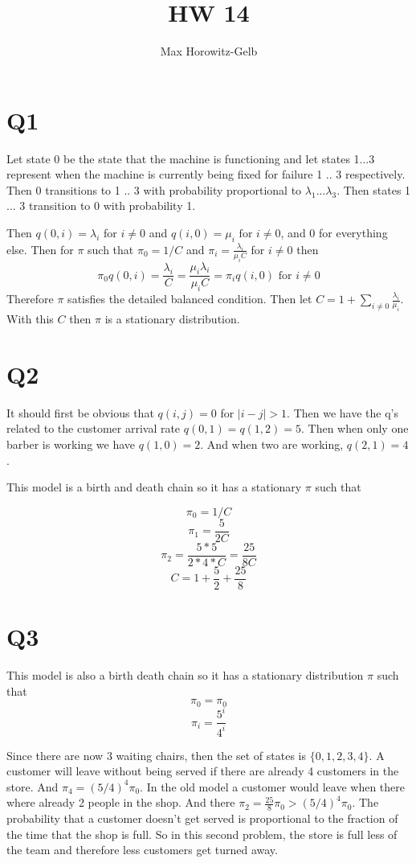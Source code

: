\documentclass{article}
\title{HW 14}
\author{Max Horowitz-Gelb}
\begin{document}
\maketitle
\section*{Q1}
Let state 0 be the state that the machine is functioning and let states 1...3 represent when the machine is currently being fixed for failure 1 .. 3 respectively. Then 0 transitions to 1 .. 3 with probability proportional to $\lambda_1 ... \lambda_3$. Then states 1 ... 3 transition to 0 with probability 1. 

Then $q(0, i) = \lambda_i$ for $i \neq 0$ and $q(i, 0) = \mu_i \text{ for } i \neq 0$, and 0 for everything else. Then for $\pi$ such that $\pi_0 = 1 / C$ and $\pi_i = \frac{\lambda_i}{\mu_i C} $ for $i \neq 0$ then 
$$
\pi_0 q(0,i) = \frac{\lambda_i}{C} = \frac{\mu_i \lambda_i}{\mu_iC} = \pi_i q(i,0) \text{ for } i \neq 0
$$
Therefore $\pi$ satisfies the detailed balanced condition. Then let $C = 1 + \sum_{i \neq 0} \frac{\lambda_i}{\mu_i}$. With this $C$ then $\pi$ is a stationary distribution. 


\section*{Q2}
It should first be obvious that $q(i,j) = 0$ for $\lvert i - j \rvert > 1$.
Then we have the q's related to the customer arrival rate
$q(0,1) = q(1,2) = 5. $
Then when only one barber is working we have
$q(1,0) = 2$. And when two are working, $q(2,1) = 4$. 

This model is a birth and death chain so it has a stationary  $\pi$ such that

$$\pi_0 = 1 / C$$
$$\pi_1 = \frac{5}{2C}$$
$$\pi_2 = \frac{5*5}{2*4*C} = \frac{25}{8C}$$
$$C = 1 + \frac{5}{2} + \frac{25}{8}$$

\section*{Q3}
This model is also a birth death chain so it has a stationary distribution $\pi$ such that
$$
\pi_0 = \pi_0
$$
$$
\pi_i = \frac{5^i}{4^i}
$$

Since there are now 3 waiting chairs, then the set of states is $\{0, 1, 2,3,4\}$. 
A customer will leave without being served if there are already 4 customers in the store. 
And $\pi_4 = (5/4)^4 \pi_0$. In the old model a customer would leave when there where already 2 people in the shop. And there $\pi_2 = \frac{25}{8} \pi_0 > (5/4)^4 \pi_0$. The probability that a customer doesn't get served is proportional to the fraction of the time that the shop is full. So in this second problem, the store is full less of the team and therefore less customers get turned away.
\end{document}
